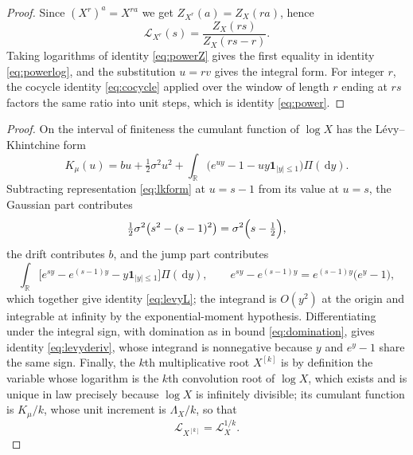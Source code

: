 \documentclass[sn-mathphys-num]{sn-jnl}
\theoremstyle{thmstyleone}%
\theoremstyle{thmstyletwo}%
\theoremstyle{thmstylethree}%
\theoremstyle{thmstyleone}%
\providecommand{\R}{\mathbb{R}}
\providecommand{\Leh}{\mathscr{L}}
\providecommand{\dd}{\,\mathrm{d}}
\begin{document}
\begin{appendices}
		\thmpowers*
		
		\begin{proof}
			Since $(X^{r})^{a}=X^{ra}$ we get $Z_{X^r}(a)=Z_X(ra)$, hence
			\begin{equation}\label{eq:powerZ}
				\Leh_{X^r}(s)=\frac{Z_X(rs)}{Z_X(rs-r)} .
			\end{equation}
			Taking logarithms of identity \eqref{eq:powerZ} gives the first equality in
			identity \eqref{eq:powerlog}, and the substitution $u=rv$ gives the
			integral form. For integer $r$, the cocycle identity
			\eqref{eq:cocycle} applied over the window of length $r$ ending at
			$rs$ factors the same ratio into unit steps, which is identity
			\eqref{eq:power}.
		\end{proof}
		
		
		\thmlevy*
		
		\begin{proof}
			On the interval of finiteness the cumulant function of $\log X$
			has the L\'evy--Khintchine form
			\begin{equation}\label{eq:lkform}
				K_\mu(u)=bu+\tfrac12\sigma^2u^2
				+\int_\R\bigl(e^{uy}-1-uy\mathbf 1_{|y|\le1}\bigr)
				\Pi(\dd y).
			\end{equation}
			Subtracting representation \eqref{eq:lkform} at $u=s-1$ from its value at
			$u=s$, the Gaussian part contributes
			\begin{equation}\label{eq:lkgauss}
				\tfrac12\sigma^2\bigl(s^2-(s-1)^2\bigr)
				=\sigma^2\Bigl(s-\tfrac12\Bigr),
			\end{equation}
			the drift contributes $b$, and the jump part contributes
			\begin{equation}\label{eq:lkjump}
				\int_\R\bigl[e^{sy}-e^{(s-1)y}
				-y\mathbf 1_{|y|\le1}\bigr]\Pi(\dd y),
				\qquad
				e^{sy}-e^{(s-1)y}=e^{(s-1)y}\bigl(e^y-1\bigr),
			\end{equation}
			which together give identity \eqref{eq:levyL}; the integrand is
			$O(y^2)$ at the origin and integrable at infinity by the
			exponential-moment hypothesis. Differentiating under the
			integral sign, with domination as in
			bound \eqref{eq:domination}, gives identity \eqref{eq:levyderiv},
			whose integrand is nonnegative because $y$ and $e^y-1$ share
			the same sign. Finally, the $k$th multiplicative root
			$X^{[k]}$ is by definition the variable whose logarithm is the
			$k$th convolution root of $\log X$, which exists and is unique
			in law precisely because $\log X$ is infinitely divisible; its
			cumulant function is $K_\mu/k$, whose unit increment is
			$\Lambda_X/k$, so that
			\begin{equation}\label{eq:multroot}
				\Leh_{X^{[k]}}=\Leh_X^{1/k} .
			\end{equation}
		\end{proof}
		

\end{appendices}
\end{document}
